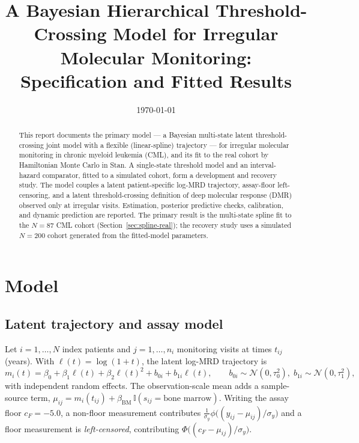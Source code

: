 \documentclass[11pt]{article}
\title{A Bayesian Hierarchical Threshold-Crossing Model for Irregular\\
Molecular Monitoring: Specification and Fitted Results}
\author{}
\date{\today}
\newcommand{\Normal}{\mathcal{N}}
\newcommand{\Ind}{\mathbb{I}}
\begin{document}
\maketitle

\begin{abstract}
\noindent This report documents the primary model --- a Bayesian multi-state latent
threshold-crossing joint model with a flexible (linear-spline) trajectory ---
for irregular molecular monitoring in chronic myeloid leukemia (CML), and its
fit to the real cohort by Hamiltonian Monte Carlo in Stan. A single-state
threshold model and an interval-hazard comparator, fitted to a simulated cohort,
form a development and recovery study. The model
couples a latent patient-specific log-MRD trajectory, assay-floor
left-censoring, and a latent threshold-crossing definition of deep molecular
response (DMR) observed only at irregular visits. Estimation, posterior
predictive checks, calibration, and dynamic prediction are reported. The primary result is the multi-state spline fit to the $N=87$ CML cohort
(Section~\ref{sec:spline-real}); the recovery study uses a simulated $N=200$
cohort generated from the fitted-model parameters.
\end{abstract}

\section{Model}

\subsection{Latent trajectory and assay model}
Let $i=1,\dots,N$ index patients and $j=1,\dots,n_i$ monitoring visits at
times $t_{ij}$ (years). With $\ell(t)=\log(1+t)$, the latent log-MRD
trajectory is
\begin{equation}
m_i(t)=\beta_0+\beta_1\ell(t)+\beta_2\ell(t)^2+b_{0i}+b_{1i}\ell(t),
\qquad b_{0i}\sim\Normal(0,\tau_0^2),\; b_{1i}\sim\Normal(0,\tau_1^2),
\end{equation}
with independent random effects. The observation-scale mean adds a
sample-source term, $\mu_{ij}=m_i(t_{ij})+\beta_{\mathrm{BM}}\,
\Ind(s_{ij}=\text{bone marrow})$. Writing the assay floor $c_F=-5.0$, a
non-floor measurement contributes $\tfrac{1}{\sigma_y}\phi\!\big((y_{ij}-
\mu_{ij})/\sigma_y\big)$ and a floor measurement is \emph{left-censored},
contributing $\Phi\!\big((c_F-\mu_{ij})/\sigma_y\big)$.
\end{document}
